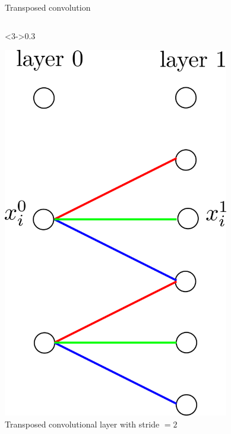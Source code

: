 \documentclass[xcolor=pdftex,dvipsnames,table,mathserif]{beamer}
\newcommand{\source}[1]{\begin{textblock*}{4cm}(8.7cm,8.6cm)
    \begin{beamercolorbox}[ht=0.5cm,right]{framesource}
      \usebeamerfont{framesource}\usebeamercolor[fg]{framesource} Credits: {#1}
    \end{beamercolorbox}
\end{textblock*}}
\begin{document}
\begin{frame}{Transposed convolution}
\begin{columns}
    \begin{column}<3->{0.3\textwidth}
      \begin{center}
        \includegraphics[width=0.74\textwidth]{transposed_conv_stride.png}
        \\ \scriptsize{Transposed convolutional layer with stride $=2$}
      \end{center}
    \end{column}

  \end{columns}


\end{frame}


\end{document}
